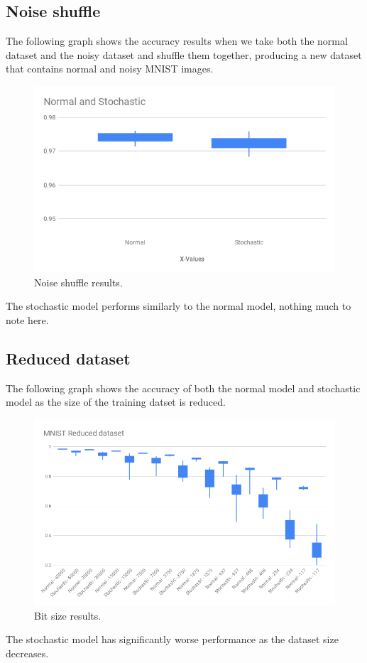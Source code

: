 \documentclass[a4paper,oneside,phd,etd]{BYUPhys}
\begin{document}
\subsection{Noise shuffle}
The following graph shows the accuracy results when we take both the normal dataset and the noisy dataset and shuffle them together, producing a new dataset that contains normal and noisy MNIST images.
\begin{figure}[H]
\centering
\includegraphics[width=12cm]{results/noise_shuffle.png}
\caption{Noise shuffle results.}
\label{fig:noise_shuffle}
\end{figure}
The stochastic model performs similarly to the normal model, nothing much to note here.

\subsection{Reduced dataset}
The following graph shows the accuracy of both the normal model and stochastic model as the size of the training datset is reduced.
\begin{figure}[H]
\centering
\includegraphics[width=12cm]{results/reduced_dataset.png}
\caption{Bit size results.}
\label{fig:dataset}
\end{figure}
The stochastic model has significantly worse performance as the dataset size decreases.
\end{document}
